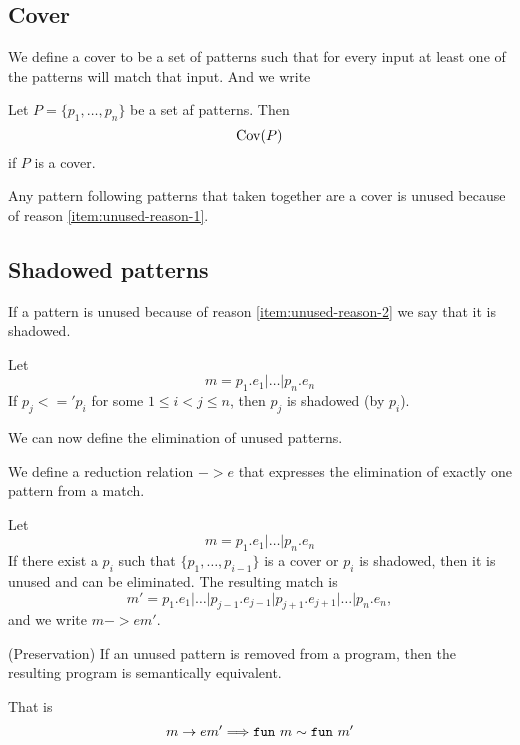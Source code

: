 \subsection{Cover}\label{sec:cover}
We define a cover to be a set of patterns such that for every input at least one
of the patterns will match that input. And we write

\begin{definition}[Cover]\label{def:cover}
  Let $P = \{p_1, \ldots, p_n \}$ be a set af patterns. Then
  \[
  \mathrm{Cov}(P)
  \]
  if $P$ is a cover.
\end{definition}

Any pattern following patterns that taken together are a cover is unused because
of reason \ref{item:unused-reason-1}.

\subsection{Shadowed patterns}\label{sec:shadowed-patterns}
If a pattern is unused because of reason \ref{item:unused-reason-2} we say that
it is shadowed.
\begin{definition}[Shadowed]
  Let
  \[
  m = p_1\texttt{.}e_1 \texttt{|} \ldots \texttt{|} p_n\texttt{.}e_n
  \]
  If $p_j <=' p_i$ for some $1 \leq i < j \leq n$, then $p_j$ is shadowed (by
  $p_i$).
\end{definition}

We can now define the elimination of unused patterns.
\begin{definition}[Elimination, $->e$]
\label{def:shadowed-patterns-1}
  We define a reduction relation $->e$ that expresses the
  elimination of exactly one pattern from a match.

  Let
  \[
  m = p_1\texttt{.}e_1 \texttt{|} \ldots \texttt{|} p_n\texttt{.}e_n
  \]
  If there exist a $p_i$ such that $\{p_1, \ldots, p_{i-1}\}$ is a cover or
  $p_i$ is shadowed, then it is unused and can be eliminated. The resulting
  match is
  \[
  m' = p_1\texttt{.}e_1 \texttt{|} \ldots \texttt{|}
  p_{j-1}\texttt{.}e_{j-1} \texttt{|} p_{j+1}\texttt{.}e_{j+1} \texttt{|}
  \ldots \texttt{|} p_n\texttt{.}e_n,
  \]
  and we write $m ->e m'$.

\end{definition}

\begin{lemma}(Preservation)
  If an unused pattern is removed from a program, then the resulting program is
  semantically equivalent.

  That is
  \[
  m ->e m' ==> \texttt{fun}\  m \sim \texttt{fun}\  m'
  \]
\end{lemma}

